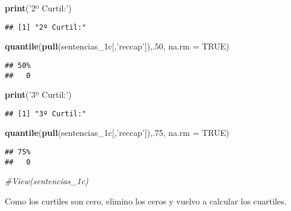 \documentclass[runningheads,a4paper]{llncs}
\newenvironment{Shaded}{}{}
\newcommand{\KeywordTok}[1]{\textcolor[rgb]{0.00,0.44,0.13}{\textbf{{#1}}}}
\newcommand{\DataTypeTok}[1]{\textcolor[rgb]{0.56,0.13,0.00}{{#1}}}
\newcommand{\DecValTok}[1]{\textcolor[rgb]{0.25,0.63,0.44}{{#1}}}
\newcommand{\StringTok}[1]{\textcolor[rgb]{0.25,0.44,0.63}{{#1}}}
\newcommand{\CommentTok}[1]{\textcolor[rgb]{0.38,0.63,0.69}{\textit{{#1}}}}
\newcommand{\OtherTok}[1]{\textcolor[rgb]{0.00,0.44,0.13}{{#1}}}
\newcommand{\NormalTok}[1]{{#1}}
\begin{document}
\begin{Shaded}
\begin{Highlighting}[]
\KeywordTok{print}\NormalTok{(}\StringTok{'2º Curtil:'}\NormalTok{)}
\end{Highlighting}
\end{Shaded}

\begin{verbatim}
## [1] "2º Curtil:"
\end{verbatim}

\begin{Shaded}
\begin{Highlighting}[]
\KeywordTok{quantile}\NormalTok{(}\KeywordTok{pull}\NormalTok{(sentencias_1c[,}\StringTok{'reccap'}\NormalTok{]),.}\DecValTok{50}\NormalTok{, }\DataTypeTok{na.rm =} \OtherTok{TRUE}\NormalTok{)}
\end{Highlighting}
\end{Shaded}

\begin{verbatim}
## 50% 
##   0
\end{verbatim}

\begin{Shaded}
\begin{Highlighting}[]
\KeywordTok{print}\NormalTok{(}\StringTok{'3º Curtil:'}\NormalTok{)}
\end{Highlighting}
\end{Shaded}

\begin{verbatim}
## [1] "3º Curtil:"
\end{verbatim}

\begin{Shaded}
\begin{Highlighting}[]
\KeywordTok{quantile}\NormalTok{(}\KeywordTok{pull}\NormalTok{(sentencias_1c[,}\StringTok{'reccap'}\NormalTok{]),.}\DecValTok{75}\NormalTok{, }\DataTypeTok{na.rm =} \OtherTok{TRUE}\NormalTok{)}
\end{Highlighting}
\end{Shaded}

\begin{verbatim}
## 75% 
##   0
\end{verbatim}

\begin{Shaded}
\begin{Highlighting}[]
\CommentTok{#View(sentencias_1c)}
\end{Highlighting}
\end{Shaded}

Como los curtiles son cero, elimino los ceros y vuelvo a calcular los
cuartiles.
\end{document}
